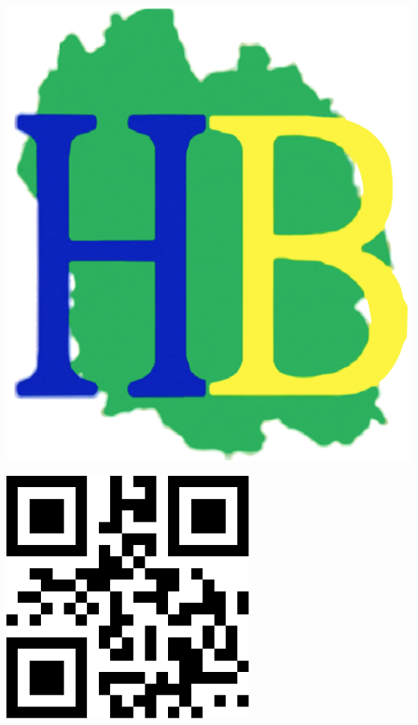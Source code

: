 \documentclass[a4paper,11pt,fleqn]{article}
\begin{document}
\Huge

\begin{block} %
{}\hfill {}
{}\hfill {}
\begin{minipage}{0.15\linewidth}
\includegraphics[width=\textwidth]{logo-HB.png}
\end{minipage}
{}\hfill {}



\begin{minipage}{0.48\linewidth}
\includegraphics[width=8cm]{QRcodes/3.pdf}
\end{minipage}
\begin{minipage}{0.5\linewidth}
{}\hfill {}
{}\hfill {}
\end{minipage}



\end{block}
\end{document}
